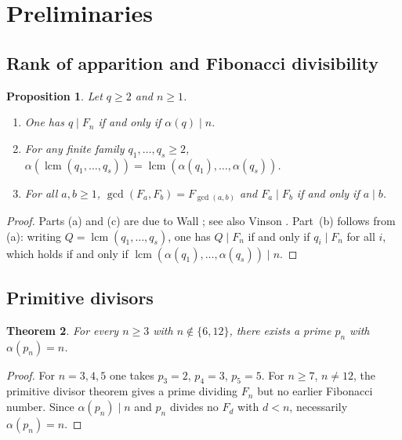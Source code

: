 \documentclass[11pt,letterpaper]{article}
\numberwithin{equation}{section}
\theoremstyle{plain}
\newtheorem{theorem}{Theorem}[section]
\newtheorem{proposition}[theorem]{Proposition}
\theoremstyle{definition}
\theoremstyle{remark}
\DeclareMathOperator{\lcmop}{lcm}
\begin{document}
\section{Preliminaries}\label{sec:prelim}

\subsection{Rank of apparition and Fibonacci divisibility}\label{subsec:fib-div}

\begin{proposition}\label{prop:rank-basics}
Let $q\ge 2$ and $n\ge 1$.
\begin{enumerate}[label=\textup{(\alph*)}]
\item One has $q\mid F_n$ if and only if $\alpha(q)\mid n$.
\item For any finite family $q_1,\dots,q_s\ge 2$,
$\alpha(\lcmop(q_1,\dots,q_s))=\lcmop(\alpha(q_1),\dots,\alpha(q_s))$.
\item For all $a,b\ge 1$, $\gcd(F_a,F_b)=F_{\gcd(a,b)}$ and
$F_a\mid F_b$ if and only if $a\mid b$.
\end{enumerate}
\end{proposition}

\begin{proof}
Parts (a) and (c) are due to Wall \cite{Wall1960FibonacciModm}; see also
Vinson \cite{Vinson1963RankApparition}. Part~(b) follows from (a): writing
$Q=\lcmop(q_1,\dots,q_s)$, one has $Q\mid F_n$ if and only if
$q_i\mid F_n$ for all $i$, which holds if and only if
$\lcmop(\alpha(q_1),\dots,\alpha(q_s))\mid n$.
\end{proof}

\subsection{Primitive divisors}\label{subsec:primitive}

\begin{theorem}\label{thm:primitive-divisors}
For every $n\ge 3$ with $n\notin\{6,12\}$, there exists a prime $p_n$ with
$\alpha(p_n)=n$.
\end{theorem}

\begin{proof}
For $n=3,4,5$ one takes $p_3=2$, $p_4=3$, $p_5=5$. For $n\ge 7$, $n\neq 12$,
the primitive divisor theorem
\cite{Carmichael1913PrimitiveDivisors,Yabuta2001PrimitiveDivisorFibonacci,%
BiluHanrotVoutier2001PrimitiveDivisorsLucas}
gives a prime dividing $F_n$ but no earlier Fibonacci number. Since
$\alpha(p_n)\mid n$ and $p_n$ divides no $F_d$ with $d<n$, necessarily
$\alpha(p_n)=n$.
\end{proof}
\end{document}
